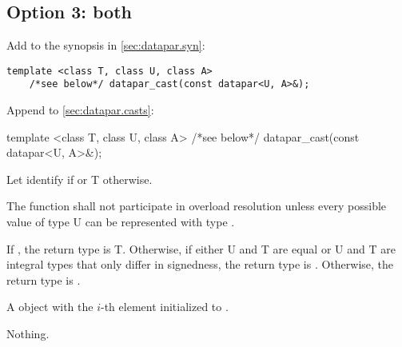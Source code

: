 \subsection{Option 3: both}
Add to the synopsis in \ref{sec:datapar.syn}:
\begin{wgText}
  \begin{lstlisting}[style=Vc]
    template <class T, class U, class A>
    /*see below*/ datapar_cast(const datapar<U, A>&);
  \end{lstlisting}
\end{wgText}

Append to \ref{sec:datapar.casts}:
\begin{wgText}
  \begin{itemdecl}
    template <class T, class U, class A>
    /*see below*/ datapar_cast(const datapar<U, A>&);
  \end{itemdecl}
  \begin{itemdescr}
    \pnum\remarks Let  identify  if  or \type T otherwise.

    \pnum\remarks The function shall not participate in overload resolution unless every possible value of type \type U can be represented with type .

    \pnum\remarks If , the return type is \type T.
    Otherwise, if either \type U and \type T are equal or \type U and \type T are integral types that only differ in signedness, the return type is \datapar[<T, A>].
    Otherwise, the return type is .

    \pnum\returns A \datapar object with the $i$-th element initialized to .

    \pnum\throws Nothing.
  \end{itemdescr}
\end{wgText}

